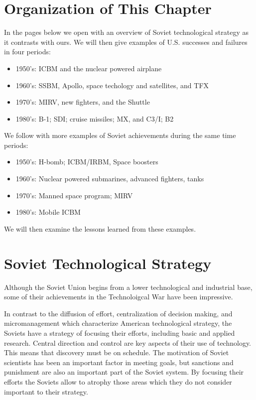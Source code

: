 \section{Organization of This Chapter}
In the pages below we open with an overview of Soviet technological strategy as it contrasts with ours. We will then give examples of U.S. successes and failures in four periods:

\begin{itemize}
    \item 1950's: ICBM and the nuclear powered airplane
    \item 1960's: SSBM, Apollo, space techology and satellites, and TFX
    \item 1970's: MIRV, new fighters, and the Shuttle
    \item 1980's: B-1; SDI; cruise missiles; MX, and C3/I; B2
\end{itemize}

We follow with more examples of Soviet achievements during the same time periods:
\begin{itemize}
    \item 1950's: H-bomb; ICBM/IRBM, Space boosters
    \item 1960's: Nuclear powered submarines, advanced fighters, tanks
    \item 1970's: Manned space program; MIRV
    \item 1980's: Mobile ICBM
\end{itemize}

We will then examine the lessons learned from these examples.

\section{Soviet Technological Strategy}
Although the Soviet Union begins from a lower technological and industrial base, some of their achievements in the Technoloigcal War have been impressive.

In contrast to the diffusion of effort, centralization of decision making, and micromanagement which characterize American technological strategy, the Soviets have a strategy of focusing their efforts, including basic and applied research. Central direction and control are key aspects of their use of technology. This means that discovery must be on schedule. The motivation of Soviet scientists has been an important factor in meeting goals, but sanctions and punishment are also an important part of the Soviet system. By focusing their efforts the Soviets allow to atrophy those areas which they do not consider important to their strategy.

